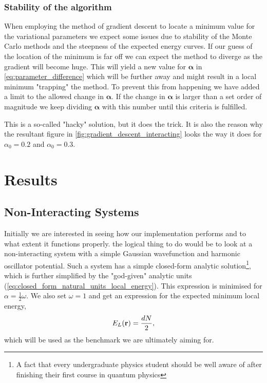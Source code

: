 \documentclass[
    a4paper, aps, twocolumn, floatfix, superscriptaddress,
    nofootinbib]{revtex4-1}
\newcommand{\vfg}{\boldsymbol}
\newcommand{\1}{\mathds{1}}
\begin{document}
            \subsubsection{Stability of the algorithm}
                When employing the method of gradient descent to locate a
                minimum value for the variational parameters we expect some
                issues due to stability of the Monte Carlo methods and the
                steepness of the expected energy curves. If our guess of the
                location of the minimum is far off we can expect the method to
                diverge as the gradient will become huge. This will yield a
                new value for $\vfg{\alpha}$ in
                \autoref{eq:parameter_difference} which will be further away and
                might result in a local minimum "trapping" the method. To
                prevent this from happening we have added a limit to the allowed
                change in $\vfg{\alpha}$. If the change in $\vfg{\alpha}$ is
                larger than a set order of magnitude we keep dividing
                $\vfg{\alpha}$ with this number until this criteria is
                fulfilled.

                This is a so-called "hacky" solution, but it does the trick. It
                is also the reason why the resultant figure in
                \autoref{fig:gradient_descent_interacting} looks the way it
                does for $\alpha_0 = 0.2$ and $\alpha_0 = 0.3$.

\section{Results}

    \subsection{Non-Interacting Systems}
        Initially we are interested in seeing how our implementation performs
        and to what extent it functions properly.  the logical thing to do would
        be to look at a non-interacting system with a simple Gaussian
        wavefunction and harmonic oscillator potential. Such a system has a
        simple closed-form analytic solution\footnote{A fact that every
        undergraduate physics student should be well aware of after finishing
        their first course in quantum physics}, which is further simplified by
        the "god-given" analytic units
        (\autoref{eq:closed_form_natural_units_local_energy}). This expression
        is minimised for $\alpha = \frac{1}{2}\omega$. We also set $\omega = 1$
        and get an expression for the expected minimum local energy,
        \begin{equation}
            E_L(\vb{r}) = \frac{dN}{2},
        \end{equation}
        which will be used as the benchmark we are ultimately aiming for.
\end{document}
